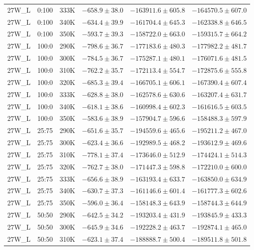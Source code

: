 \begin{longtable}{|c|c|c|c|c|c|}
27W\_L & 0:100 & 333K & $-658.9 \pm 38.0$ & $-163911.6 \pm 605.8$ & $-164570.5 \pm 607.0$ \\
27W\_L & 0:100 & 340K & $-634.4 \pm 39.9$ & $-161704.4 \pm 645.3$ & $-162338.8 \pm 646.5$ \\
27W\_L & 0:100 & 350K & $-593.7 \pm 39.3$ & $-158722.0 \pm 663.0$ & $-159315.7 \pm 664.2$ \\
27W\_L & 100:0 & 290K & $-798.6 \pm 36.7$ & $-177183.6 \pm 480.3$ & $-177982.2 \pm 481.7$ \\
27W\_L & 100:0 & 300K & $-784.5 \pm 36.7$ & $-175287.1 \pm 480.1$ & $-176071.6 \pm 481.5$ \\
27W\_L & 100:0 & 310K & $-762.2 \pm 35.7$ & $-172113.4 \pm 554.7$ & $-172875.6 \pm 555.8$ \\
27W\_L & 100:0 & 320K & $-685.3 \pm 39.4$ & $-166705.1 \pm 606.1$ & $-167390.4 \pm 607.4$ \\
27W\_L & 100:0 & 333K & $-628.8 \pm 38.0$ & $-162578.6 \pm 630.6$ & $-163207.4 \pm 631.7$ \\
27W\_L & 100:0 & 340K & $-618.1 \pm 38.6$ & $-160998.4 \pm 602.3$ & $-161616.5 \pm 603.5$ \\
27W\_L & 100:0 & 350K & $-583.6 \pm 38.9$ & $-157904.7 \pm 596.6$ & $-158488.3 \pm 597.9$ \\
27W\_L & 25:75 & 290K & $-651.6 \pm 35.7$ & $-194559.6 \pm 465.6$ & $-195211.2 \pm 467.0$ \\
27W\_L & 25:75 & 300K & $-623.4 \pm 36.6$ & $-192989.5 \pm 468.2$ & $-193612.9 \pm 469.6$ \\
27W\_L & 25:75 & 310K & $-778.1 \pm 37.4$ & $-173646.0 \pm 512.9$ & $-174424.1 \pm 514.3$ \\
27W\_L & 25:75 & 320K & $-762.7 \pm 38.0$ & $-171447.3 \pm 598.8$ & $-172210.0 \pm 600.0$ \\
27W\_L & 25:75 & 333K & $-656.6 \pm 38.9$ & $-163193.4 \pm 633.7$ & $-163850.0 \pm 634.9$ \\
27W\_L & 25:75 & 340K & $-630.7 \pm 37.3$ & $-161146.6 \pm 601.4$ & $-161777.3 \pm 602.6$ \\
27W\_L & 25:75 & 350K & $-596.0 \pm 36.4$ & $-158148.3 \pm 643.9$ & $-158744.3 \pm 644.9$ \\
27W\_L & 50:50 & 290K & $-642.5 \pm 34.2$ & $-193203.4 \pm 431.9$ & $-193845.9 \pm 433.3$ \\
27W\_L & 50:50 & 300K & $-645.9 \pm 34.6$ & $-192228.2 \pm 463.7$ & $-192874.1 \pm 465.0$ \\
27W\_L & 50:50 & 310K & $-623.1 \pm 37.4$ & $-188888.7 \pm 500.4$ & $-189511.8 \pm 501.8$ \\

\end{longtable}
